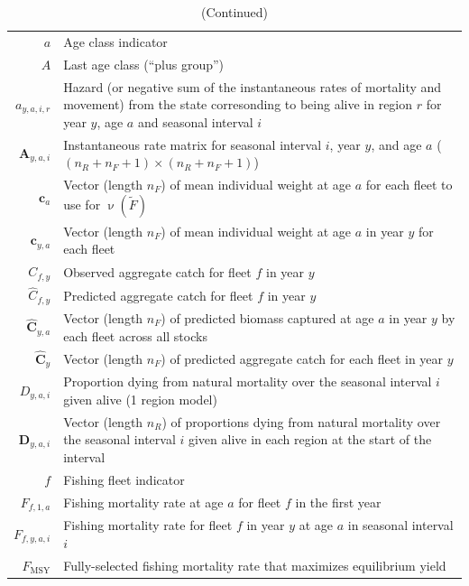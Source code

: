 \documentclass[
]{article}
\begin{document}
\setcounter{table}{0}
\renewcommand\thetable{A\arabic{table}}
\begin{longtable}[c]{r p{}}
\caption{Definition of terms.\label{symbols}}%
\\ \hline \hline \endfirsthead 
\caption[]{(Continued)} %
\\ \hline \hline \endhead
 \hline \hline \endfoot
$a$ & Age class indicator\\
$A$ & Last age class (``plus group'')\\
$a_{y,a,i,r}$ & Hazard (or negative sum of the instantaneous rates of mortality and movement) from the state corresonding to being alive in region $r$ for year $y$, age $a$ and seasonal interval $i$\\
$\mathbf{A}_{y,a,i}$ & Instantaneous rate matrix for seasonal interval $i$, year $y$, and age $a$ ($(n_R + n_F + 1) \times (n_R + n_F + 1)$)\\
$\mathbf{c}_{a}$ & Vector (length $n_F$) of mean individual weight at age $a$ for each fleet to use for $\upnu(\widetilde{F})$\\
$\mathbf{c}_{y,a}$ & Vector (length $n_F$) of mean individual weight at age $a$ in year $y$ for each fleet\\
$C_{f,y}$ & Observed aggregate catch for fleet $f$ in year $y$\\
$\widehat C_{f,y}$ & Predicted aggregate catch for fleet $f$ in year $y$\\
$\widehat{\mathbf{C}}_{y,a}$ & Vector (length $n_F$) of predicted biomass captured at age $a$ in year $y$ by each fleet across all stocks\\
$\widehat{\mathbf{C}}_y$ & Vector (length $n_F$) of predicted aggregate catch for each fleet in year $y$\\
$D_{y,a,i}$ & Proportion dying from natural mortality over the seasonal interval $i$ given alive (1 region model)\\
$\mathbf{D}_{y,a,i}$ & Vector (length $n_R$) of proportions dying from natural mortality over the seasonal interval $i$ given alive  in each region at the start of the interval\\
$f$ & Fishing fleet indicator\\
$F_{f,1,a}$ & Fishing mortality rate at age $a$ for fleet $f$ in the first year\\
$F_{f,y,a,i}$ & Fishing mortality rate for fleet $f$ in year $y$ at age $a$ in seasonal interval $i$\\
$F_{\text{MSY}}$ & Fully-selected fishing mortality rate that maximizes equilibrium yield\\

\end{longtable}
\end{document}
